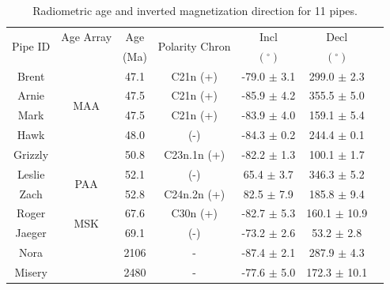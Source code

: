\begin{table}[]
\centering
\caption{Radiometric age and inverted magnetization direction for 11 pipes.}
\label{Age_Summary}
\renewcommand{\arraystretch}{1.2}
\begin{tabular}{|c|c|c|c|c|c|c|}
\hline
	\multirow{2}{*}{Pipe ID} 	&	Age Array &	Age &	\multirow{2}{*}{Polarity Chron} 	&	Incl &	Decl \\
						&	\cite{Lockhart2004}	& (Ma)	& (+ , - )	& $(^{\circ})$ & $(^{\circ})$ \\
	\hline
	Brent 	&	\multirow{4}{*}{MAA}		&47.1 &	C21n (+) 	&	 -79.0 $\pm$ 3.1 &	 299.0 $\pm$ 2.3 \\
	Arnie 	&	&47.5 &	C21n (+) 	&	 -85.9 $\pm$ 4.2 &	 355.5 $\pm$ 5.0 \\
	Mark 	&	&47.5 &	C21n (+) 	&	 -83.9 $\pm$ 4.0 &	 159.1 $\pm$ 5.4 \\
	Hawk 	&	&48.0 &	(-) &	 -84.3 $\pm$ 0.2 &	 244.4 $\pm$ 0.1 \\
	\hline
	Grizzly 	&	&50.8 &	C23n.1n (+) 	&	 -82.2 $\pm$ 1.3 &	 100.1 $\pm$ 1.7 \\ \hline
	Leslie 	&	\multirow{2}{*}{PAA}&52.1 &	(-) &	 65.4 $\pm$ 3.7 &	 346.3 $\pm$ 5.2 \\
	Zach 	&	&52.8 &	C24n.2n (+) 	&	 82.5 $\pm$ 7.9 &	 185.8 $\pm$ 9.4 \\
	\hline
	Roger 	&	\multirow{2}{*}{MSK}&67.6 &	C30n (+) 	&	 -82.7 $\pm$ 5.3 &	 160.1 $\pm$ 10.9 \\
	Jaeger 	&	&69.1 &	(-) &	 -73.2 $\pm$ 2.6 &	 53.2 $\pm$ 2.8 \\
	\hline
	Nora 	&	&2106 & 	- 		&	 -87.4 $\pm$ 2.1 &	 287.9 $\pm$ 4.3 \\
	Misery 	&	&2480 & 	- 		&	 -77.6 $\pm$ 5.0 &	 172.3 $\pm$ 10.1 \\ \hline
	
\end{tabular}

\end{table}


\endinput


